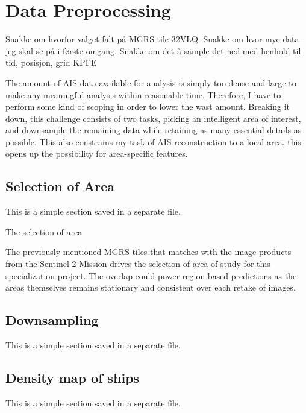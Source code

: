 \chapter[Data Preprocessing]{Data Preprocessing}
\begin{info}
	Snakke om hvorfor valget falt på MGRS tile 32VLQ. Snakke om hvor mye data jeg skal se på i første omgang. Snakke om det å sample det ned med henhold til tid, posisjon, grid KPFE
\end{info}

The amount of AIS data available for analysis is simply too dense and large to make any meaningful analysis within reasonable time. Therefore, I have to perform some kind of scoping in order to lower the wast amount. Breaking it down, this challenge consists of two tasks, picking an intelligent area of interest, and downsample the remaining data while retaining as many essential details as possible. This also constrains my task of AIS-reconstruction to a local area, this opens up the possibility for area-specific features.  


\section{Selection of Area}
\begin{info}{}
	This is a simple section saved in a separate file.
\end{info}
The selection of area 

The previously mentioned MGRS-tiles that matches with the image products from the Sentinel-2 Mission drives the selection of area of study for this specialization project. The overlap could power region-based predictions as the areas themselves remains stationary and consistent over each retake of images.  






\section{Downsampling}
\begin{info}{}
	This is a simple section saved in a separate file.
\end{info}







\section{Density map of ships}
\begin{info}{}
	This is a simple section saved in a separate file.
\end{info}





